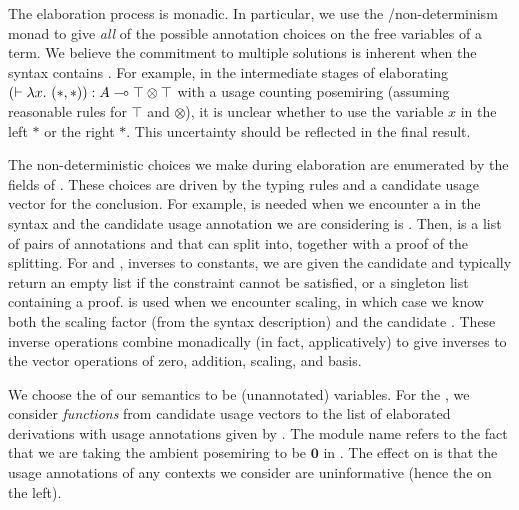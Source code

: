 The elaboration process is monadic.
In particular, we use the /non-determinism monad to give
\emph{all} of the possible annotation choices on the free variables of a term.
We believe the commitment to multiple solutions is inherent when the syntax
contains .
For example, in the intermediate stages of elaborating
$\plr{\vdash \lambda x.~\plr{*,*}} : A \multimap \top \otimes \top$ with a
usage counting posemiring (assuming reasonable rules for $\top$ and $\otimes$),
it is unclear whether to use the variable $x$ in the left $*$ or the right $*$.
This uncertainty should be reflected in the final result.

The non-deterministic choices we make during elaboration are enumerated by
the fields of .
These choices are driven by the typing rules and a candidate usage vector for
the conclusion.
For example, \AgdaSpace{} is needed when we
encounter a  in the syntax and the candidate
usage annotation we are considering is .
Then, \AgdaSpace{} is a list of pairs of
annotations  and  that  can split into,
together with a proof of the splitting.
For  and , inverses to constants,
we are given the candidate  and typically return an empty list if
the constraint cannot be satisfied, or a singleton list containing a proof.
 is used when we encounter scaling, in which case we know
both the scaling factor  (from the syntax description) and the
candidate .
These inverse operations combine monadically (in fact, applicatively) to give
inverses to the vector operations of zero, addition, scaling, and basis.


We choose the \AgdaBound{$\V$} of our semantics to be (unannotated) variables.
For the \AgdaBound{$\C$}, we consider \emph{functions} from candidate usage
vectors  to the list of elaborated derivations with usage
annotations given by .
The module name  refers to the fact that we are taking the
ambient posemiring to be $\mathbf0$ in .
The effect on  is that the usage annotations of any
contexts we consider are uninformative (hence the \AgdaSymbol{\_} on the left).

